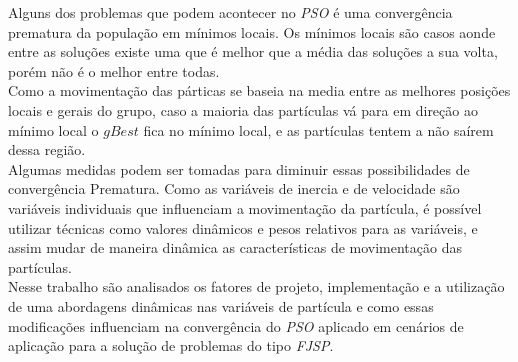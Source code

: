 \indent Alguns dos problemas que podem acontecer no \textit{PSO} é uma convergência prematura da população em mínimos locais.
Os mínimos locais são casos aonde entre as soluções existe uma que é melhor que a média das soluções a sua volta, porém não é o melhor entre todas.\\
Como a movimentação das párticas se baseia na media entre as melhores posições locais e gerais do grupo, caso a maioria das partículas vá para em direção ao mínimo local o $gBest$ fica no mínimo local, e as partículas tentem a não saírem dessa região.\\
\indent Algumas medidas podem ser tomadas para diminuir essas possibilidades de convergência Prematura.
Como as variáveis de inercia e de velocidade são variáveis individuais que influenciam a movimentação da partícula, é possível utilizar técnicas como valores dinâmicos e pesos relativos para as variáveis, e assim mudar de maneira dinâmica as características de movimentação das partículas.\\
\indent Nesse trabalho são analisados os fatores de projeto, implementação e a utilização de uma abordagens dinâmicas nas variáveis de partícula e como essas modificações influenciam na convergência do \textit{PSO} aplicado em cenários de aplicação para a solução de problemas do tipo \textit{FJSP}.


